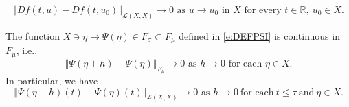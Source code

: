\documentclass[10pt,a4paper]{amsart}
\newcommand{\R}{\mathbb{R}}
\newcommand{\norm}[1]{\left\Vert#1\right\Vert}
\renewcommand{\leq}{\leqslant}
\begin{document}
\begin{equation}\label{e:FRECHET3}
\norm{Df(t,u)-Df(t,u_0)}_{\mathcal{L}(X,X)}\to 0\text{ as }u\to u_0\text{ in }X\text{ for every }t\in\R,\ u_0\in X. 
\end{equation}

\begin{thm}
The function $X\ni \eta\mapsto \Psi(\eta)\in F_\sigma\subset F_\mu$ defined in \eqref{e:DEFPSI} is continuous in $F_\mu$, i.e.,
$$\norm{\Psi(\eta+h)-\Psi(\eta)}_{F_\mu}\to 0\text{ as }h\to0\text{ for each }\eta\in X.$$ 
In particular, we have
\begin{equation}\label{e:CONTINFSIGMA}
\norm{\Psi(\eta+h)(t)-\Psi(\eta)(t)}_{\mathcal{L}(X,X)}\to0\text{ as }h\to0\ \text{for each}\ t\leq\tau\ \text{and}\ \eta\in X.
\end{equation}
\end{thm}
\end{document}
